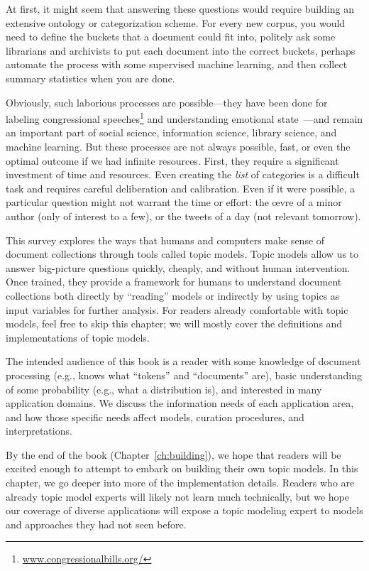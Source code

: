 At first, it might seem that answering these questions would require building an
extensive ontology or categorization scheme.  For every new corpus, you would 
need to define  the buckets that a document could fit into, politely ask some librarians and
archivists to put each document into the correct buckets, perhaps automate the
process with some supervised machine learning, and then collect summary
statistics when you are done.

Obviously, such laborious processes are possible---they have been done
for labeling congressional
speeches\footnote{\url{www.congressionalbills.org/}} and understanding
emotional state~\citep{wiebestates}---and remain an important part of
social science, information science, library science, and machine
learning.  But these processes are not always possible, fast, or even
the optimal outcome if we had infinite resources.  First, they
 require a significant investment of time and resources.
Even creating the \emph{list} of categories is a difficult task and
requires careful deliberation and calibration.  Even if it were possible, a
particular question might not warrant the time or effort: the \oe{}vre
of a minor author (only of interest to a few), or the tweets of a day
(not relevant tomorrow).

This survey explores the ways that humans and
computers make sense of document collections through tools called topic models.
Topic models allow us to answer big-picture questions quickly, cheaply, and without human intervention.
Once trained, they provide a framework for humans to understand document collections both directly by ``reading'' models or indirectly by using topics as input variables for further analysis.
For readers already comfortable with topic models, feel free to skip this
chapter; we will mostly cover the definitions and implementations of topic models.

The intended audience of this book is a reader with some knowledge of
document processing (e.g., knows what ``tokens'' and ``documents''
are), basic understanding of some probability (e.g., what a
distribution is), and interested in many application domains.  We
discuss the information needs of each application area, and how those
specific needs affect models, curation procedures, and
interpretations.

By the end of the book (Chapter~\ref{ch:building}), we hope that
readers will be excited enough to attempt to embark on building their
own topic models.  In this chapter, we go deeper into more of the
implementation details.  Readers who are already topic model experts
will likely not learn much technically, but we hope our coverage of
diverse applications will expose a topic modeling expert to models and
approaches they had not seen before.

